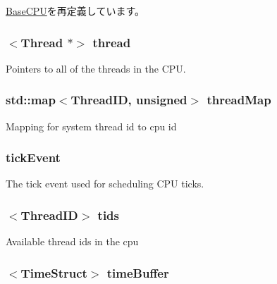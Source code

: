\hyperlink{classBaseCPU_ab737471139f5a296e5b26e8a0e1b0744}{BaseCPU}を再定義しています。\hypertarget{classFullO3CPU_afe9da004c5a3f37cbb72fa3763d4c0d1}{
\subsubsection[{thread}]{$<${\bf Thread} $\ast$$>$ {\bf thread}}}
\label{classFullO3CPU_afe9da004c5a3f37cbb72fa3763d4c0d1}
Pointers to all of the threads in the CPU. \hypertarget{classFullO3CPU_a08db914bbe37a5fa8c008248fa9647f6}{
\subsubsection[{threadMap}]{\setlength{\rightskip}{0pt plus 5cm}std::map$<${\bf ThreadID}, unsigned$>$ {\bf threadMap}}}
\label{classFullO3CPU_a08db914bbe37a5fa8c008248fa9647f6}
Mapping for system thread id to cpu id \hypertarget{classFullO3CPU_aa36b8e894416f0ec98f701ab08f2ac22}{
\subsubsection[{tickEvent}]{ {\bf tickEvent}}}
\label{classFullO3CPU_aa36b8e894416f0ec98f701ab08f2ac22}
The tick event used for scheduling CPU ticks. \hypertarget{classFullO3CPU_a457642e81692e24e601ec32c778042a2}{
\subsubsection[{tids}]{$<${\bf ThreadID}$>$ {\bf tids}}}
\label{classFullO3CPU_a457642e81692e24e601ec32c778042a2}
Available thread ids in the cpu \hypertarget{classFullO3CPU_ad72b6568a4a40f54d071c31bef16bf2e}{
\subsubsection[{timeBuffer}]{$<${\bf TimeStruct}$>$ {\bf timeBuffer}}}
